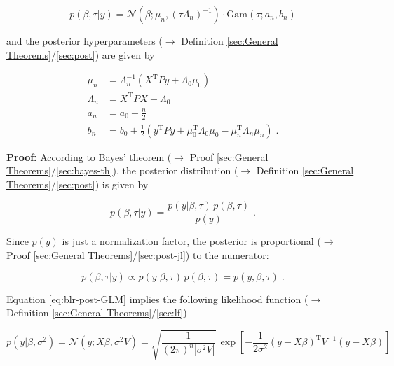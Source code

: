 \documentclass[a4paper,12pt,twoside]{book}
\begin{document}
\begin{equation} \label{eq:blr-post-GLM-NG-post}
p(\beta,\tau|y) = \mathcal{N}(\beta; \mu_n, (\tau \Lambda_n)^{-1}) \cdot \mathrm{Gam}(\tau; a_n, b_n)
\end{equation}

and the posterior hyperparameters ($\rightarrow$ Definition \ref{sec:General Theorems}/\ref{sec:post}) are given by

\begin{equation} \label{eq:blr-post-GLM-NG-post-par}
\begin{split}
\mu_n &= \Lambda_n^{-1} (X^\mathrm{T} P y + \Lambda_0 \mu_0) \\
\Lambda_n &= X^\mathrm{T} P X + \Lambda_0 \\
a_n &= a_0 + \frac{n}{2} \\
b_n &= b_0 + \frac{1}{2} (y^\mathrm{T} P y + \mu_0^\mathrm{T} \Lambda_0 \mu_0 - \mu_n^\mathrm{T} \Lambda_n \mu_n) \; .
\end{split}
\end{equation}


\vspace{1em}
\textbf{Proof:} According to Bayes' theorem ($\rightarrow$ Proof \ref{sec:General Theorems}/\ref{sec:bayes-th}), the posterior distribution ($\rightarrow$ Definition \ref{sec:General Theorems}/\ref{sec:post}) is given by

\begin{equation} \label{eq:blr-post-GLM-NG-BT}
p(\beta,\tau|y) = \frac{p(y|\beta,\tau) \, p(\beta,\tau)}{p(y)} \; .
\end{equation}

Since $p(y)$ is just a normalization factor, the posterior is proportional ($\rightarrow$ Proof \ref{sec:General Theorems}/\ref{sec:post-jl}) to the numerator:

\begin{equation} \label{eq:blr-post-GLM-NG-post-JL}
p(\beta,\tau|y) \propto p(y|\beta,\tau) \, p(\beta,\tau) = p(y,\beta,\tau) \; .
\end{equation}

Equation \eqref{eq:blr-post-GLM} implies the following likelihood function ($\rightarrow$ Definition \ref{sec:General Theorems}/\ref{sec:lf})

\begin{equation} \label{eq:blr-post-GLM-LF-class}
p(y|\beta,\sigma^2) = \mathcal{N}(y; X \beta, \sigma^2 V) = \sqrt{\frac{1}{(2 \pi)^n |\sigma^2 V|}} \, \exp\left[ -\frac{1}{2 \sigma^2} (y-X\beta)^\mathrm{T} V^{-1} (y-X\beta) \right]
\end{equation}
\end{document}

